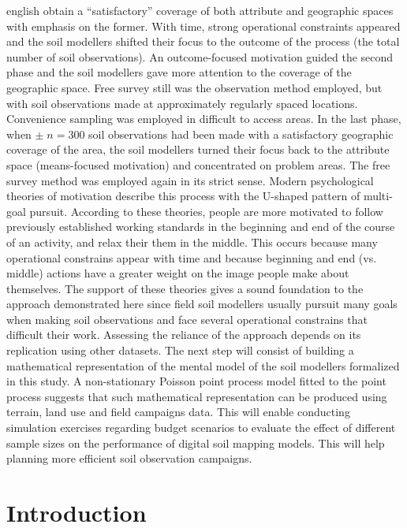 \begin{chapterabstract}{english}{\englishkeys}
obtain a ``satisfactory'' coverage of both attribute and geographic spaces with emphasis on the former. With 
time, strong operational constraints appeared and the soil modellers shifted their focus to the outcome of the 
process (the total number of soil observations). An outcome-focused motivation guided the second phase and 
the soil modellers gave more attention to the coverage of the geographic space. Free survey still was the 
observation method employed, but with soil observations made at approximately regularly spaced locations. 
Convenience sampling was employed in difficult to access areas. In the last phase, when $\pm\;n=300$ soil 
observations had been made with a satisfactory geographic coverage of the area, the soil modellers turned 
their focus back to the attribute space (means-focused motivation) and concentrated on problem areas. 
The free survey method was employed again in its strict sense. Modern psychological theories of motivation 
describe this process with the U-shaped pattern of multi-goal pursuit. According to these theories, people are 
more motivated to follow previously established working standards in the beginning and end of the course of an 
activity, and relax their them in the middle. This occurs because many operational constrains appear with time 
and because beginning and end (vs. middle) actions have a greater weight on the image people make about 
themselves. The support of these theories gives a sound foundation to the approach demonstrated here since 
field soil modellers usually pursuit many goals when making soil observations and face several operational 
constrains that difficult their work. Assessing the reliance of the approach depends on its replication using 
other datasets. The next step will consist of building a mathematical representation of the mental model of 
the soil modellers formalized in this study. A non-stationary Poisson point process model fitted to the point 
process suggests that such mathematical representation can be produced using terrain, land use and field 
campaigns data. This will enable conducting simulation exercises regarding budget scenarios to evaluate the 
effect of different sample sizes on the performance of digital soil mapping models. This will help planning 
more efficient soil observation campaigns.
\end{chapterabstract}

\formatchapter

\section{Introduction}

